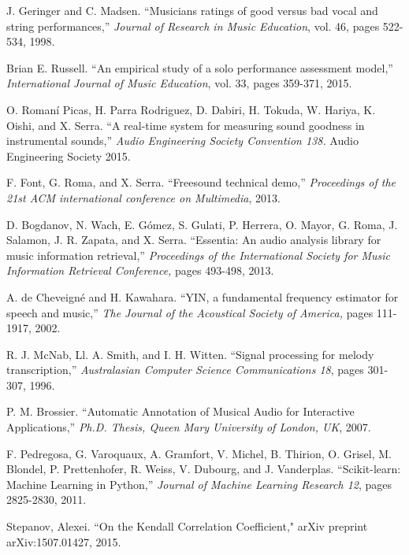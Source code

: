 \documentclass{article}
\begin{document}
\begin{thebibliography}{citations}

J. Geringer and C. Madsen.
``Musicians ratings of good versus bad vocal and string performances,''
{\it Journal of Research in Music Education}, vol. 46, pages 522-534, 1998.

Brian E. Russell.
``An empirical study of a solo performance assessment model,''
{\it  International Journal of Music Education}, vol. 33, pages 359-371, 2015.

O. Romaní Picas, H. Parra Rodriguez, D. Dabiri, H. Tokuda, W. Hariya, K. Oishi, and X. Serra.
``A real-time system for measuring sound goodness in instrumental sounds,''
{\it Audio Engineering Society Convention 138.} Audio Engineering Society 2015.

 F. Font, G. Roma, and X. Serra.
``Freesound technical demo,''
{\it Proceedings of the 21st ACM international conference on Multimedia}, 2013.

 D. Bogdanov, N. Wach, E. G\'omez, S. Gulati, P. Herrera, O. Mayor, G. Roma, J. Salamon, J. R. Zapata, and X. Serra.
``Essentia: An audio analysis library for music information retrieval,''
{\it  Proceedings of the International Society for Music Information Retrieval Conference,} pages 493-498, 2013.

 A. de Cheveigné and H. Kawahara.
``YIN, a fundamental frequency estimator for speech and music,''
{\it The Journal of the Acoustical Society of America,} pages 111-1917, 2002.

 R. J. McNab, Ll. A. Smith, and I. H. Witten.
``Signal processing for melody transcription,''
{\it Australasian Computer Science Communications 18}, pages 301-307, 1996.

P. M. Brossier.
``Automatic Annotation of Musical Audio for Interactive Applications,''
{\it Ph.D. Thesis, Queen Mary University of London, UK}, 2007.

F. Pedregosa, G. Varoquaux, A. Gramfort, V. Michel, B. Thirion, O. Grisel, M. Blondel, P. Prettenhofer, R. Weiss, V. Dubourg, and J. Vanderplas.
``Scikit-learn: Machine Learning in Python,''
{\it Journal of Machine Learning Research 12}, pages 2825-2830, 2011.

Stepanov, Alexei. ``On the Kendall Correlation Coefficient," arXiv preprint arXiv:1507.01427, 2015.



\end{thebibliography}
\end{document}
